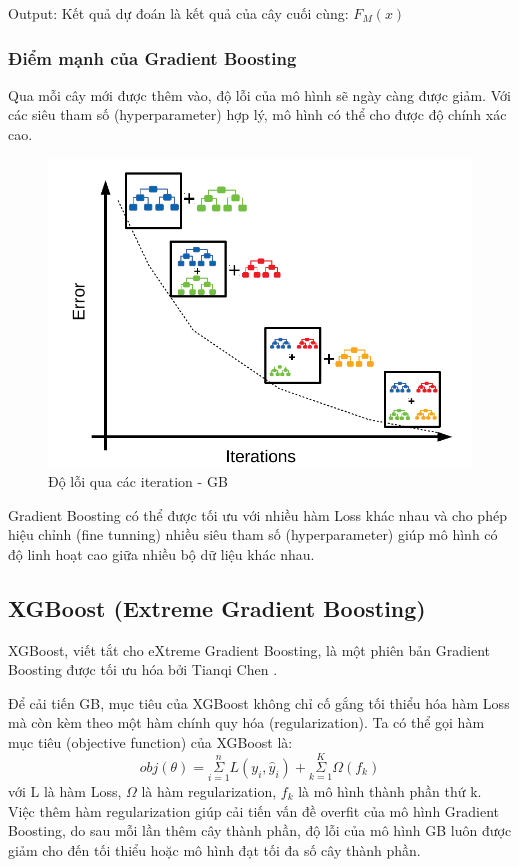         Output: Kết quả dự đoán là kết quả của cây cuối cùng: $F_{M}(x)$
        
    \subsubsection{Điểm mạnh của Gradient Boosting}
        Qua mỗi cây mới được thêm vào, độ lỗi của mô hình sẽ ngày càng được giảm. Với các siêu tham số (hyperparameter) hợp lý, mô hình có thể cho được độ chính xác cao.
        
        \begin{figure}[htp]
        \centering
        \includegraphics[width=10 cm,]{images/GB_error.png}
        \caption{Độ lỗi qua các iteration - GB \cite{gb_graph}}
        \label{fig:gb}
        \end{figure}
            
        Gradient Boosting có thể được tối ưu với nhiều hàm Loss khác nhau và cho phép hiệu chỉnh (fine tunning) nhiều siêu tham số (hyperparameter) giúp mô hình có độ linh hoạt cao giữa nhiều bộ dữ liệu khác nhau.


\subsection{XGBoost (Extreme Gradient Boosting)}
    XGBoost, viết tắt cho eXtreme Gradient Boosting, là một phiên bản Gradient Boosting được tối ưu hóa bởi Tianqi Chen \cite{chen2016xgboost}.
    
    Để cải tiến GB, mục tiêu của XGBoost không chỉ cố gắng tối thiểu hóa hàm Loss mà còn kèm theo một hàm chính quy hóa (regularization). Ta có thể gọi hàm mục tiêu (objective function) của XGBoost là: \cite{xgboost_model_tut}
    \begin{equation}
        obj(\theta) = \underset{i=1}{\overset{n}{\Sigma}} L(y_{i}, \hat{y}_{i}) + \underset{k=1}{\overset{K}{\Sigma}} \Omega(f_{k}) 
    \end{equation}
    với L là hàm Loss, $\Omega$ là hàm regularization, $f_{k}$ là mô hình thành phần thứ k. Việc thêm hàm regularization giúp cải tiến vấn đề overfit của mô hình Gradient Boosting, do sau mỗi lần thêm cây thành phần, độ lỗi của mô hình GB luôn được giảm cho đến tối thiểu hoặc mô hình đạt tối đa số cây thành phần.
    
